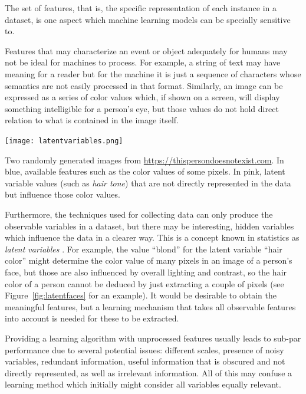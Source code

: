 The set of features, that is, the specific representation of each instance in a dataset, is one aspect which machine learning models can be specially sensitive to.

Features that may characterize an event or object adequately for humans may not be ideal for machines to process. For example, a string of text may have meaning for a reader but for the machine it is just a sequence of characters whose semantics are not easily processed in that format. Similarly, an image can be expressed as a series of color values which, if shown on a screen, will display something intelligible for a person's eye, but those values do not hold direct relation to what is contained in the image itself.

\begin{marginfigure}
\texttt{[image: latentvariables.png]}
\caption[Two randomly generated faces.]{\label{fig:latentfaces}Two randomly generated images from \url{https://thispersondoesnotexist.com}. In blue, available features such as the color values of some pixels. In pink, latent variable values (such as \textit{hair tone}) that are not directly represented in the data but influence those color values.}
\end{marginfigure}

Furthermore, the techniques used for collecting data can only produce the observable variables in a dataset, but there may be interesting, hidden variables which influence the data in a clearer way. This is a concept known in statistics as \textit{latent variables} . For example, the value  ``blond'' for the latent variable ``hair color'' might determine the color value of many pixels in an image of a person's face, but those are also influenced by overall lighting and contrast, so the hair color of a person cannot be deduced by just extracting a couple of pixels (see Figure~\ref{fig:latentfaces} for an example). It would be desirable to obtain the meaningful features, but a learning mechanism that takes all observable features into account is needed for these to be extracted.

Providing a learning algorithm with unprocessed features usually leads to sub-par performance due to several potential issues: different scales, presence of noisy variables, redundant information, useful information that is obscured and not directly represented, as well as irrelevant information. All of this may confuse a learning method which initially might consider all variables equally relevant.


